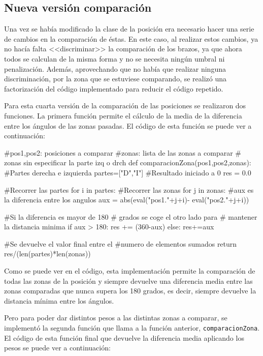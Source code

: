 {\subsection{Nueva versión comparación}
Una vez se había modificado la clase de la posición era necesario hacer una serie de cambios en la comparación de éstas. En este caso, al realizar estos cambios, ya no hacía falta <<discriminar>> la comparación de los brazos, ya que ahora todos se calculan de la misma forma y no se necesita ningún umbral ni penalización. Además, aprovechando que no había que realizar ninguna discriminación, por la zona que se estuviese comparando, se realizó una factorización del código implementado para reducir el código repetido.

Para esta cuarta versión de la comparación de las posiciones se realizaron dos funciones. La primera función permite el cálculo de la media de la diferencia entre los ángulos de las zonas pasadas. El código de esta función se puede ver a continuación:

\begin{python}
#pos1,pos2: posiciones a comparar
#zonas: lista de las zonas a comparar
# zonas sin especificar la parte izq o drch
def comparacionZona(pos1,pos2,zonas):
	#Partes derecha e izquierda
	partes=["D","I"]
	#Resultado iniciado a 0
	res = 0.0
	
	#Recorrer las partes
	for i in partes:
		#Recorrer las zonas
		for j in zonas:
			#aux es la diferencia entre los angulos
			aux = abs(eval("pos1."+j+i)-
			          eval("pos2."+j+i))
	
			#Si la diferencia es mayor de 180
			# grados se coge el otro lado para
			# mantener la distancia minima
			if aux > 180:
				res += (360-aux)
			else:
				res+=aux
	
	#Se devuelve el valor final entre el
	#numero de elementos sumados
	return res/(len(partes)*len(zonas))
\end{python}

Como se puede ver en el código, esta implementación permite la comparación de todas las zonas de la posición y siempre devuelve una diferencia media entre las zonas comparadas que nunca supera los 180 grados, es decir, siempre devuelve la distancia mínima entre los ángulos.

Pero para poder dar distintos pesos a las distintas zonas a comparar, se implementó la segunda función que llama a la función anterior, \texttt{comparacionZona}. El código de esta función final que devuelve la diferencia media aplicando los pesos se puede ver a continuación:

}
